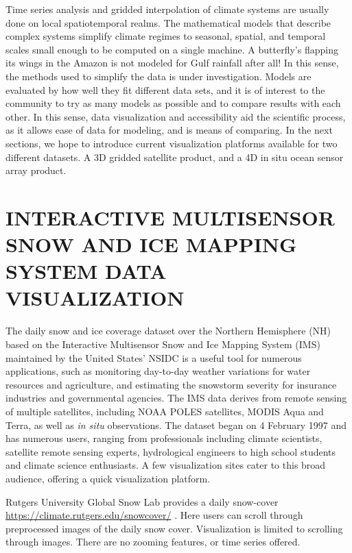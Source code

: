 Time series analysis and gridded interpolation of climate systems are usually done on local spatiotemporal realms. The mathematical models that describe complex systems simplify climate regimes to seasonal, spatial, and temporal scales small enough to be computed on a single machine. A butterfly's flapping its wings in the Amazon is not modeled for Gulf rainfall after all! In this sense, the methods used to simplify the data is under investigation. Models are evaluated by how well they fit different data sets, and it is of interest to the community to try as many models as possible and to compare results with each other. In this sense, data visualization and accessibility aid the scientific process, as it allows ease of data for modeling, and is means of comparing. In the next sections, we hope to introduce current visualization platforms available for two different datasets. A 3D gridded satellite product, and a 4D in situ ocean sensor array product.

\section{INTERACTIVE MULTISENSOR SNOW AND ICE MAPPING SYSTEM DATA VISUALIZATION}

The daily snow and ice coverage dataset over the Northern Hemisphere (NH)
based on the Interactive Multisensor Snow and Ice Mapping System (IMS) maintained by the United States' NSIDC \cite{NIC} is a useful tool for numerous applications, such as monitoring day-to-day weather variations for water resources and agriculture, and estimating the snowstorm severity for insurance industries and governmental agencies. 
The IMS data derives from remote sensing of multiple satellites, including NOAA POLES satellites,
MODIS Aqua and Terra, as well as {\it in situ} observations. \cite{fetterer2011ims,ramsay1998interactive}
The dataset began on 4 February 1997 and has numerous users, ranging from professionals including climate scientists, satellite remote sensing experts, hydrological engineers to high school students and climate science enthusiasts. A few visualization sites cater to this broad audience, offering a quick visualization platform. 

Rutgers University Global Snow Lab provides a daily snow-cover \url{https://climate.rutgers.edu/snowcover/} \cite{rutgers_sl}. Here users can scroll through preprocessed images of the daily snow cover. Visualization is limited to scrolling through images. There are no zooming features, or time series offered.

